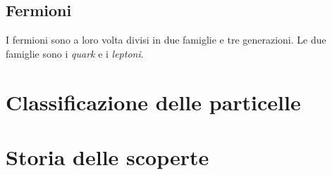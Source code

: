         \subsection{Fermioni}
            I fermioni sono a loro volta divisi in due famiglie e tre generazioni. Le due famiglie sono i \emph{quark} e i \emph{leptoni}. 
    \section{Classificazione delle particelle}
        \begin{figure}
            \centering
            
        \end{figure}
    \section{Storia delle scoperte}